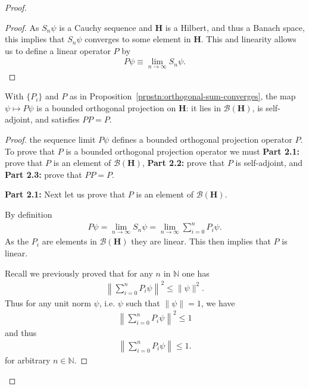 \begin{proof}
\begin{proof}
As $S_n\psi$ is a Cauchy sequence and $\mathbf{H}$ is a Hilbert, and thus a Banach space, this implies that $S_n\psi$ converges to some element in $\mathbf{H}$. This and linearity allows us to define a linear operator $P$ by
\begin{align}
    P\psi \equiv \lim\limits_{n \rightarrow \infty} S_n\psi.
\end{align}
\end{proof}

\begin{proposition}
    \label{prpstn:orthogonal-sum-is-projection}
    \leanok
    With $\{P_i\}$ and $P$ as in Proposition~\ref{prpstn:orthogonal-sum-converges}, the map $\psi \mapsto P\psi$ is a bounded orthogonal projection on $\mathbf{H}$: it lies in $\mathcal{B}(\mathbf{H})$, is self-adjoint, and satisfies $PP = P$.
\end{proposition}
\begin{proof}
    \leanok
the sequence limit $P\psi$ defines a bounded orthogonal projection operator $P$. To prove that $P$ is a bounded orthogonal projection operator we must \textbf{Part 2.1:} prove that $P$ is an element of $\mathcal{B}(\mathbf{H})$, \textbf{Part 2.2:} prove that $P$ is self-adjoint, and \textbf{Part 2.3:} prove that $PP=P$.

\textbf{Part 2.1:} Next let us prove that $P$ is an element of $\mathcal{B}(\mathbf{H})$.

By definition
\begin{align}
    P\psi = \lim\limits_{n \rightarrow \infty} S_n\psi = \lim\limits_{n \rightarrow \infty} \sum_{i = 0}^n P_i\psi.
\end{align}
As the $P_i$ are elements in $\mathcal{B}(\mathbf{H})$ they are linear. This then implies that $P$ is linear.

Recall we previously proved that for any $n$ in $\mathbb{N}$ one has
\begin{align}
    \left\| \sum_{i = 0}^n P_i\psi \right\|^2 \le \|\psi\|^2.
\end{align}
Thus for any unit norm $\psi$, i.e. $\psi$ such that $\|\psi\| = 1$, we have
\begin{align}
    \left\| \sum_{i = 0}^n P_i\psi \right\|^2  \le 1
\end{align}
and thus
\begin{align}
    \left\| \sum_{i = 0}^n P_i\psi \right\|  \le 1.
\end{align}
for arbitrary $n \in \mathbb{N}$.


\end{proof}
\end{proof}
